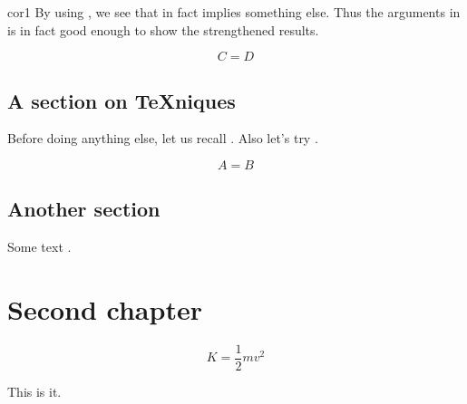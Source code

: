 \documentclass[noocg]{wwwnotes2}
\begin{document}
\begin{pfof}{cor1}
	By using , we see that  in fact implies something else. Thus the arguments in  is in fact good enough to show the strengthened results. 
\end{pfof}

\begin{equation}
	C = D
\end{equation}

\section{A section on \TeX{}niques}

Before doing anything else, let us recall . Also let's try .

\lipsum[2]

\begin{equation}
	A = B
\end{equation}

\lipsum[3-8]



\section{Another section}

\lipsum[5-9]

Some text \cite{Wong2009}.


\chapter{Second chapter}


\lipsum[10-23]

\begin{equation}
K = \frac12 mv^2
\end{equation}

This is it.


\cleardoublepage
\printbibliography[heading=bibintoc]
\end{document}
